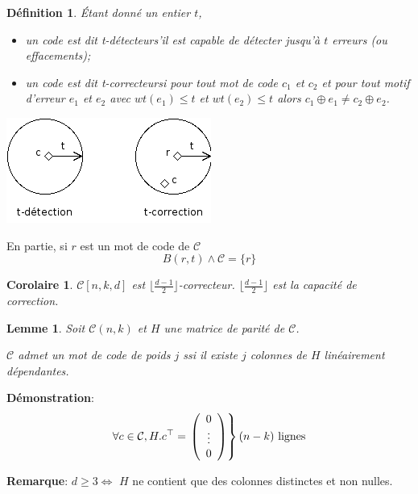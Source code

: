 \documentclass[a4paper,10pt,twocolumn]{article}
\theoremstyle{break}
\newtheorem{mydef}{Définition}
\newtheorem{mylemma}{Lemme}
\newtheorem{mycor}{Corolaire}
\newenvironment{note}[1]
{\textbf{#1}:}
{}
\newenvironment{mydem}
{\begin{note}{Démonstration}}
{\end{note}}
\newenvironment{remarque}
{\begin{note}{Remarque}}
{\end{note}}
\begin{document}
\begin{mydef}
 Étant donné un entier $t$,
\begin{itemize}
 \item un code est dit \flqq t-détecteur\frqq s'il est capable de détecter jusqu'à $t$ erreurs (ou effacements);
 \item un code est dit \flqq t-correcteur\frqq si pour tout mot de code $c_1$ et $c_2$ et pour tout motif d'erreur $e_1$ et $e_2$
 avec $wt(e_1) \le t$ et $wt(e_2) \le t$ alors $c_1 \oplus e_1 \ne c_2 \oplus e_2$.
\end{itemize}
\end{mydef}

\begin{center}
\includegraphics[width=0.6\linewidth]{corr-detect}
\end{center}

En partie, si $r$ est un mot de code de $\mathcal{C}$
$$B(r,t) \wedge \mathcal{C} = \lbrace r \rbrace $$

\begin{mycor}
$\mathcal{C}[n,k,d]$ est $\lfloor \frac{d-1}{2} \rfloor$-correcteur. 
$\lfloor \frac{d-1}{2} \rfloor$ est la capacité de correction.
\end{mycor}

\begin{mylemma}
 Soit $\mathcal{C}(n,k)$ et $H$ une matrice de parité de $\mathcal{C}$.
 
 $\mathcal{C}$ admet un mot de code de poids $j$ ssi il existe $j$ colonnes de $H$ linéairement dépendantes.
\end{mylemma}

\begin{mydem}
 $$\forall c \in \mathcal{C}, H.c^\top = \left. \left(\begin{array}{c} 0 \\ \vdots \\ 0 \end{array}\right) \right \rbrace (n-k)\ \rm{lignes} $$
\end{mydem}

\begin{remarque}
 $d \ge 3 \Longleftrightarrow$ $H$ ne contient que des colonnes distinctes et non nulles.
\end{remarque}
\end{document}
